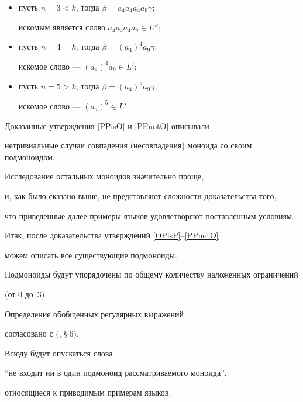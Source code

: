  \begin{itemize}


 \item[1)]


 пусть $n=3<k$, тогда $\beta=a_4a_4a_4a_9\gamma$;


 искомым является слово $a_4a_4a_4a_9\in L''$;


 \item[2)]


 пусть $n=4=k$, тогда $\beta=(a_4)^4a_9\gamma$;


 искомое слово --- $(a_4)^4a_9\in L'$;


 \item[3)]


 пусть $n=5>k$, тогда $\beta=(a_4)^5a_9\gamma$;


 искомое слово --- $(a_4)^5\in L'$.


 \end{itemize}





 Доказанные утверждения \ref{PPisO} и \ref{PPnotO} описывали


 нетривиальные случаи совпадения (несовпадения) моноида со своим подмоноидом.


 Исследование остальных моноидов значительно проще,


 и, как было сказано выше, не представляют сложности доказательства того,


 что приведенные далее примеры языков удовлетворяют поставленным условиям.


 Итак, после доказательства утверждений \ref{OPisP}--\ref{PPnotO}


 можем описать все существующие подмоноиды.





 Подмоноиды будут упорядочены по общему количеству наложенных ограничений


 (от $0$ до~$3$).


 Определение обобщенных регулярных выражений


 согласовано с (\cite{per}, \S\,6).


 Всюду будут опускаться слова


 ``не входит ни в один подмоноид рассматриваемого моноида'',


 относящиеся к приводимым примерам языков.


\medskip





